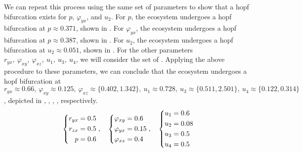 We can repeat this process using the same set of parameters to show that a hopf bifurcation exists for $p$, $\varphi_{yx}$, and $u_2$. For $p$, the ecosystem undergoes a hopf bifurcation at $p\approx 0.371$, shown in . For $\varphi_{yx}$, the ecosystem undergoes a hopf bifurcation at $p\approx 0.387$, shown in . For $u_2$, the ecosystem undergoes a hopf bifurcation at $u_2\approx 0.051$, shown in . For the other parameters $r_{yx},\ \varphi_{xy},\ \varphi_{xz},\ u_1,\ u_3,\ u_4$, we will consider the set of . Applying the above procedure to these parameters, we can conclude that the ecosystem undergoes a hopf bifurcation at $r_{yx}\approx 0.66,\ \varphi_{xy}\approx 0.125,\ \varphi_{xz}\approx\{0.402,1.342\},\ u_1\approx 0.728,\ u_3\approx\{0.511,2.501\},\ u_4\approx\{0.122,0.314\}$, depicted in , , , ,  respectively.
\begin{equation}\label{params:interior-b}
    \begin{dcases}
        \begin{aligned}
            r_{yx} &= 0.5\\
            r_{zx} &= 0.5\\
            p &= 0.6
        \end{aligned}
    \end{dcases},\quad 
    \begin{dcases}
        \begin{aligned}
            \varphi_{xy} &= 0.6\\
            \varphi_{yx} &= 0.15\\
            \varphi_{xz} &= 0.4
        \end{aligned}
    \end{dcases},\quad
    \begin{dcases}
        \begin{aligned}
            u_1 &= 0.6\\
            u_2 &= 0.08\\
            u_3 &= 0.5\\
            u_4 &= 0.5
        \end{aligned}
    \end{dcases}
\end{equation}

